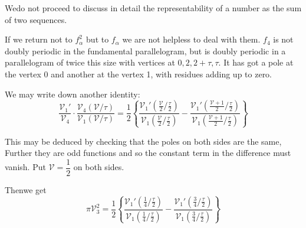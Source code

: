 We\pageoriginale do not proceed to discuss in detail the representability of a
number as the sum of two sequences.

If we return not to $f_\alpha^2$ but to $f_\alpha$ we are not helpless
to deal with them. $f_4$ is not doubly periodic in the fundamental
parallelogram, but is doubly periodic in a parallelogram of twice this
size with vertices at $0, 2, 2+ \tau, \tau$. It has got a pole at the
vertex 0 and another at the vertex 1, with residues adding up to
zero. 
\begin{figure}[H]
\end{figure}

We may write down another identity:
$$
\frac{\mathscr{V}_1'}{\mathscr{V}_4} \cdot
\frac{\mathscr{V}_4(\mathscr{V}/\tau)}{\mathscr{V}_1
  (\mathscr{V}/\tau)}
= \frac{1}{2} \left\{ \frac{\mathscr{V}_1' \left(
  \frac{\mathscr{V}}{2}\Big/
  \frac{\tau}{2}\right)}{\mathscr{V}_1\left( \frac{\mathscr{V}}{2}
  \Big/ \frac{\tau}{2}\right)} - \frac{\mathscr{V}_1'\left(
  \frac{\mathscr{V}+1}{2} \Big/ \frac{\tau}{2}\right)}{\mathscr{V}_1
  \left( \frac{\mathscr{V}+1}{2} \Big/ \frac{\tau}{2}\right)}\right\} 
$$

This may be deduced by checking that the poles on both sides are the
same, Further they are odd functions and so the constant term in the
difference must vanish. Put $\mathscr{V}= \dfrac{1}{2}$ on both
sides. 

Then\pageoriginale we get
$$
\pi \mathscr{V}_3^2
= \frac{1}{2} \left\{ \frac{\mathscr{V}_1' \left(
  \frac{1}{4}\Big/ \frac{\tau}{2}\right)}{\mathscr{V}_1\left( \frac{1}{4}
  \Big/ \frac{\tau}{2}\right)} - \frac{\mathscr{V}_1'\left(
  \frac{3}{4} \Big/ \frac{\tau}{2}\right)}{\mathscr{V}_1
  \left( \frac{3}{4} \Big/ \frac{\tau}{2}\right)}\right\} 
$$

